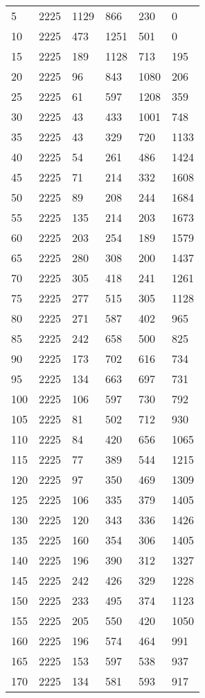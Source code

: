 \begin{longtable}{|l|l|l|l|l|l|}
5 & 2225 & 1129 & 866 & 230 & 0 \\
10 & 2225 & 473 & 1251 & 501 & 0 \\
15 & 2225 & 189 & 1128 & 713 & 195 \\
20 & 2225 & 96 & 843 & 1080 & 206 \\
25 & 2225 & 61 & 597 & 1208 & 359 \\
30 & 2225 & 43 & 433 & 1001 & 748 \\
35 & 2225 & 43 & 329 & 720 & 1133 \\
40 & 2225 & 54 & 261 & 486 & 1424 \\
45 & 2225 & 71 & 214 & 332 & 1608 \\
50 & 2225 & 89 & 208 & 244 & 1684 \\
55 & 2225 & 135 & 214 & 203 & 1673 \\
60 & 2225 & 203 & 254 & 189 & 1579 \\
65 & 2225 & 280 & 308 & 200 & 1437 \\
70 & 2225 & 305 & 418 & 241 & 1261 \\
75 & 2225 & 277 & 515 & 305 & 1128 \\
80 & 2225 & 271 & 587 & 402 & 965 \\
85 & 2225 & 242 & 658 & 500 & 825 \\
90 & 2225 & 173 & 702 & 616 & 734 \\
95 & 2225 & 134 & 663 & 697 & 731 \\
100 & 2225 & 106 & 597 & 730 & 792 \\
105 & 2225 & 81 & 502 & 712 & 930 \\
110 & 2225 & 84 & 420 & 656 & 1065 \\
115 & 2225 & 77 & 389 & 544 & 1215 \\
120 & 2225 & 97 & 350 & 469 & 1309 \\
125 & 2225 & 106 & 335 & 379 & 1405 \\
130 & 2225 & 120 & 343 & 336 & 1426 \\
135 & 2225 & 160 & 354 & 306 & 1405 \\
140 & 2225 & 196 & 390 & 312 & 1327 \\
145 & 2225 & 242 & 426 & 329 & 1228 \\
150 & 2225 & 233 & 495 & 374 & 1123 \\
155 & 2225 & 205 & 550 & 420 & 1050 \\
160 & 2225 & 196 & 574 & 464 & 991 \\
165 & 2225 & 153 & 597 & 538 & 937 \\
170 & 2225 & 134 & 581 & 593 & 917 \\

\end{longtable}
